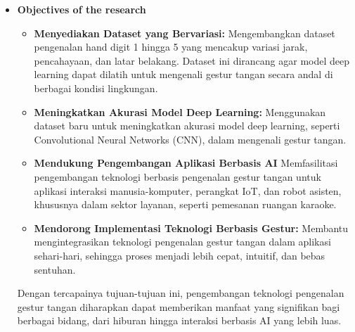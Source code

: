 \documentclass[12pt,a4paper]{article}
\begin{document}
\begin{itemize}
\begin{itemize}
    \end{itemize}

    \item \textbf {Objectives of the research}


    \begin{itemize}
    \item \textbf{Menyediakan Dataset yang Bervariasi:}  
    Mengembangkan dataset pengenalan hand digit 1 hingga 5 yang mencakup variasi jarak, pencahayaan, dan latar belakang. Dataset ini dirancang agar model deep learning dapat dilatih untuk mengenali gestur tangan secara andal di berbagai kondisi lingkungan.
    
    \item \textbf{Meningkatkan Akurasi Model Deep Learning:}  
    Menggunakan dataset baru untuk meningkatkan akurasi model deep learning, seperti Convolutional Neural Networks (CNN), dalam mengenali gestur tangan.
    
    \item \textbf{Mendukung Pengembangan Aplikasi Berbasis AI}  
    Memfasilitasi pengembangan teknologi berbasis pengenalan gestur tangan untuk aplikasi interaksi manusia-komputer, perangkat IoT, dan robot asisten, khususnya dalam sektor layanan, seperti pemesanan ruangan karaoke.
    
    \item \textbf{Mendorong Implementasi Teknologi Berbasis Gestur:}  
    Membantu mengintegrasikan teknologi pengenalan gestur tangan dalam aplikasi sehari-hari, sehingga proses menjadi lebih cepat, intuitif, dan bebas sentuhan.
    \end{itemize}

\hspace{0.5cm} Dengan tercapainya tujuan-tujuan ini, pengembangan teknologi pengenalan gestur tangan diharapkan dapat memberikan manfaat yang signifikan bagi berbagai bidang, dari hiburan hingga interaksi berbasis AI yang lebih luas.

\end{itemize}

\end{document}
